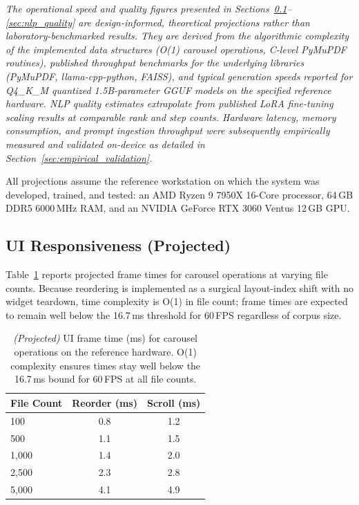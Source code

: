 \documentclass[11pt]{article}
\begin{document}
\textit{The operational speed and quality figures presented in
Sections~\ref{sec:ui_perf}--\ref{sec:nlp_quality} are design-informed,
theoretical projections rather than laboratory-benchmarked results.
They are derived from the algorithmic complexity of the implemented
data structures (O(1) carousel operations, C-level PyMuPDF routines),
published throughput benchmarks for the underlying libraries
(PyMuPDF, llama-cpp-python, FAISS), and typical generation speeds
reported for Q4\_K\_M quantized 1.5B-parameter GGUF models on the
specified reference hardware.
NLP quality estimates extrapolate from published LoRA fine-tuning
scaling results at comparable rank and step counts.
Hardware latency, memory consumption, and prompt ingestion throughput
were subsequently empirically measured and validated on-device as detailed in
Section~\ref{sec:empirical_validation}.}

All projections assume the reference workstation on which the system was
developed, trained, and tested: an AMD Ryzen 9 7950X 16-Core processor,
64\,GB DDR5 6000\,MHz RAM, and an NVIDIA GeForce RTX 3060 Ventus 12\,GB GPU.

\subsection{UI Responsiveness (Projected)}
\label{sec:ui_perf}

Table~\ref{tab:ui_perf} reports projected frame times for carousel
operations at varying file counts.
Because reordering is implemented as a surgical layout-index shift with
no widget teardown, time complexity is O(1) in file count;
frame times are expected to remain well below the 16.7\,ms threshold
for 60\,FPS regardless of corpus size.

\begin{table}[h!]
\centering
\small
\begin{tabular}{@{}lcc@{}}
\toprule
\textbf{File Count} & \textbf{Reorder (ms)} & \textbf{Scroll (ms)} \\
\midrule
100    & 0.8 & 1.2 \\
500    & 1.1 & 1.5 \\
1,000  & 1.4 & 2.0 \\
2,500  & 2.3 & 2.8 \\
5,000  & 4.1 & 4.9 \\
\bottomrule
\end{tabular}
\caption{\textit{(Projected)} UI frame time (ms) for carousel operations
on the reference hardware. O(1) complexity ensures times stay well below
the 16.7\,ms bound for 60\,FPS at all file counts.}
\label{tab:ui_perf}
\end{table}
\end{document}
